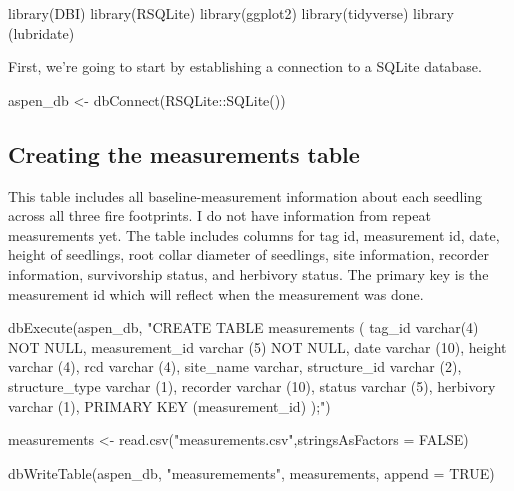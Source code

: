 \documentclass[
]{book}
\newenvironment{Shaded}{\begin{snugshade}}{\end{snugshade}}
\newcommand{\AttributeTok}[1]{\textcolor[rgb]{0.77,0.63,0.00}{#1}}
\newcommand{\ConstantTok}[1]{\textcolor[rgb]{0.00,0.00,0.00}{#1}}
\newcommand{\FunctionTok}[1]{\textcolor[rgb]{0.00,0.00,0.00}{#1}}
\newcommand{\NormalTok}[1]{#1}
\newcommand{\OtherTok}[1]{\textcolor[rgb]{0.56,0.35,0.01}{#1}}
\newcommand{\SpecialCharTok}[1]{\textcolor[rgb]{0.00,0.00,0.00}{#1}}
\newcommand{\StringTok}[1]{\textcolor[rgb]{0.31,0.60,0.02}{#1}}
\begin{document}
\begin{Shaded}
\begin{Highlighting}[]
\FunctionTok{library}\NormalTok{(DBI)}
\FunctionTok{library}\NormalTok{(RSQLite)}
\FunctionTok{library}\NormalTok{(ggplot2)}
\FunctionTok{library}\NormalTok{(tidyverse)}
\FunctionTok{library}\NormalTok{ (lubridate)}
\end{Highlighting}
\end{Shaded}

First, we're going to start by establishing a connection to a SQLite database.

\begin{Shaded}
\begin{Highlighting}[]
\NormalTok{aspen\_db }\OtherTok{\textless{}{-}} \FunctionTok{dbConnect}\NormalTok{(RSQLite}\SpecialCharTok{::}\FunctionTok{SQLite}\NormalTok{())}
\end{Highlighting}
\end{Shaded}

\hypertarget{creating-the-measurements-table}{%
\subsection{Creating the measurements table}\label{creating-the-measurements-table}}

This table includes all baseline-measurement information about each seedling across all three fire footprints. I do not have information from repeat measurements yet. The table includes columns for tag id, measurement id, date, height of seedlings, root collar diameter of seedlings, site information, recorder information, survivorship status, and herbivory status. The primary key is the measurement id which will reflect when the measurement was done.

\begin{Shaded}
\begin{Highlighting}[]
\FunctionTok{dbExecute}\NormalTok{(aspen\_db, }\StringTok{"CREATE TABLE measurements (}
\StringTok{tag\_id varchar(4) NOT NULL,}
\StringTok{measurement\_id varchar (5) NOT NULL,}
\StringTok{date varchar (10), }
\StringTok{height varchar (4), }
\StringTok{rcd varchar (4),}
\StringTok{site\_name varchar, }
\StringTok{structure\_id varchar (2),}
\StringTok{structure\_type varchar (1),}
\StringTok{recorder varchar (10), }
\StringTok{status varchar (5),}
\StringTok{herbivory varchar (1),}
\StringTok{PRIMARY KEY (measurement\_id)}
\StringTok{);"}\NormalTok{)}

\NormalTok{measurements }\OtherTok{\textless{}{-}} \FunctionTok{read.csv}\NormalTok{(}\StringTok{"measurements.csv"}\NormalTok{,}\AttributeTok{stringsAsFactors =} \ConstantTok{FALSE}\NormalTok{)}

\FunctionTok{dbWriteTable}\NormalTok{(aspen\_db, }\StringTok{"measuremements"}\NormalTok{, measurements, }\AttributeTok{append =} \ConstantTok{TRUE}\NormalTok{)}
\end{Highlighting}
\end{Shaded}
\end{document}
